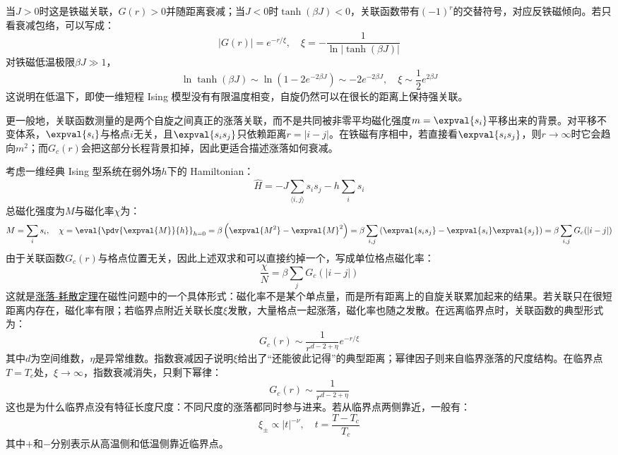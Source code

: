 当$J>0$时这是铁磁关联，$G(r)>0$并随距离衰减；当$J<0$时$\tanh(\beta J)<0$，关联函数带有$(-1)^r$的交替符号，对应反铁磁倾向。若只看衰减包络，可以写成：
\[|G(r)|=e^{-r/\xi},\quad \xi=-\frac{1}{\ln|\tanh(\beta J)|}\]
对铁磁低温极限$\beta J\gg1$，
\[\ln\tanh(\beta J)\sim\ln(1-2e^{-2\beta J})\sim-2e^{-2\beta J},\quad \xi\sim\frac{1}{2}e^{2\beta J}\]
这说明在低温下，即使一维短程 Ising 模型没有有限温度相变，自旋仍然可以在很长的距离上保持强关联。

更一般地，关联函数测量的是两个自旋之间真正的涨落关联，而不是共同被非零平均磁化强度$m=\expval{s_i}$平移出来的背景。对平移不变体系，$\expval{s_i}$与格点$i$无关，且$\expval{s_is_j}$只依赖距离$r=|i-j|$。在铁磁有序相中，若直接看$\expval{s_is_j}$，则$r\to\infty$时它会趋向$m^2$；而$G_c(r)$会把这部分长程背景扣掉，因此更适合描述涨落如何衰减。

考虑一维经典 Ising 型系统在弱外场$h$下的 Hamiltonian：
\[\hat H=-J\sum_{\langle i,j\rangle}s_is_j-h\sum_is_i\]
总磁化强度为$M$与磁化率$\chi$为：
\[M=\sum_i s_i,\quad \chi=\eval{\pdv{\expval{M}}{h}}_{h=0}=\beta\left(\expval{M^2}-\expval{M}^2\right)=\beta\sum_{i,j}\left(\expval{s_is_j}-\expval{s_i}\expval{s_j}\right)=\beta\sum_{i,j}G_c(|i-j|)\]
由于关联函数$G_c(r)$与格点位置无关，因此上述双求和可以直接约掉一个，写成单位格点磁化率：
\[\frac{\chi}{N}=\beta\sum_jG_c(|i-j|)\]
这就是\href{https://en.wikipedia.org/wiki/Fluctuation%E2%80%93dissipation_theorem}{涨落-耗散定理}在磁性问题中的一个具体形式：磁化率不是某个单点量，而是所有距离上的自旋关联累加起来的结果。若关联只在很短距离内存在，磁化率有限；若临界点附近关联长度$\xi$发散，大量格点一起涨落，磁化率也随之发散。在远离临界点时，关联函数的典型形式为：
\[G_c(r)\sim\frac{1}{r^{d-2+\eta}}e^{-r/\xi}\]
其中$d$为空间维数，$\eta$是异常维数。指数衰减因子说明$\xi$给出了“还能彼此记得”的典型距离；幂律因子则来自临界涨落的尺度结构。在临界点$T=T_c$处，$\xi\to\infty$，指数衰减消失，只剩下幂律：
\[G_c(r)\sim\frac{1}{r^{d-2+\eta}}\]
这也是为什么临界点没有特征长度尺度：不同尺度的涨落都同时参与进来。若从临界点两侧靠近，一般有：
\[\xi_\pm\propto |t|^{-\nu},\quad t=\frac{T-T_c}{T_c}\]
其中$+$和$-$分别表示从高温侧和低温侧靠近临界点。

